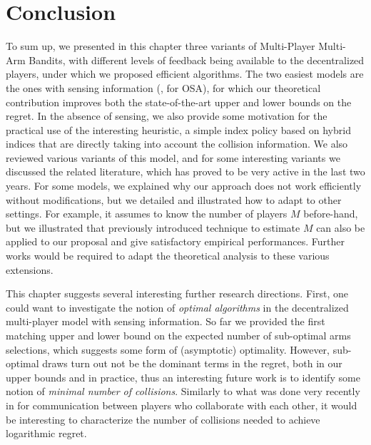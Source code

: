 \section{Conclusion}
\label{sec:5:conclusion}

To sum up, we presented in this chapter three variants of Multi-Player Multi-Arm Bandits,
with different levels of feedback being available to the decentralized players, under which we proposed efficient algorithms.
The two easiest models are the ones with sensing information (\ie, for OSA), for which our theoretical contribution improves both the state-of-the-art upper and lower bounds on the regret. In the absence of sensing, we also provide some motivation for the practical use of the interesting \Selfish{} heuristic, a simple index policy based on hybrid indices that are directly taking  into account the collision information.
%
We also reviewed various variants of this model, and for some interesting variants we discussed the related literature, which has proved to be very active in the last two years. For some models, we explained why our approach does not work efficiently without modifications, but we detailed and illustrated how to adapt \MCTopM{} to other settings.
For example, it assumes to know the number of players $M$ before-hand, but we illustrated that previously introduced technique to estimate $M$ can also be applied to our proposal and give satisfactory empirical performances.
Further works would be required to adapt the theoretical analysis to these various extensions.

This chapter suggests several interesting further research directions.
First, one could want to investigate the notion of \emph{optimal algorithms} in the decentralized multi-player model with sensing information. So far we provided the first matching upper and lower bound on the expected number of sub-optimal arms selections, which suggests some form of (asymptotic) optimality. However, sub-optimal draws turn out not be the dominant terms in the regret, both in our upper bounds and in practice, thus an interesting future work is to identify some notion of \emph{minimal number of collisions}.
Similarly to what was done very recently in \cite{wang2019distributed} for communication between players who collaborate with each other, it would be interesting to characterize the number of collisions needed to achieve logarithmic regret.

